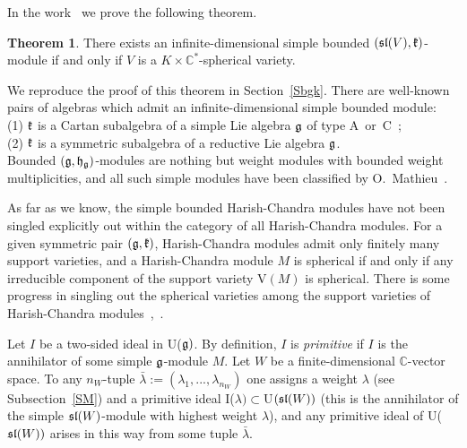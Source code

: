 \documentclass[12pt]{amsart}
\theoremstyle{definition}\newtheorem{theorem}{Theorem}[section]
\theoremstyle{definition}\newtheorem{definition}[proposition]{Definition}
\theoremstyle{remark}\newtheorem{example}[proposition]{Example}
\begin{document}
In the work~\cite{Ya1} we prove the following theorem.
\begin{theorem}\label{Tbgk}There exists an infinite-dimensional simple bounded $(\frak{sl}(V), \frak k)$-module if and only if $V$ is a $K \times\mathbb C^*$-spherical variety.\end{theorem}
We reproduce the proof of this theorem in Section~\ref{Sbgk}. There are well-known pairs of algebras which admit an infinite-dimensional simple bounded module:\\
(1) $\frak k$ is a Cartan subalgebra of a simple Lie algebra $\frak g$ of type A~or~C~\cite{F};\\
(2) $\frak k$ is a symmetric subalgebra of a reductive Lie algebra $\frak g$.\\
Bounded $(\frak g, \frak h_\frak g)$-modules are nothing but weight modules with bounded weight multiplicities, and all such simple modules have been classified by O.~Mathieu~\cite{M}.

As far as we know, the simple bounded Harish-Chandra modules have not been singled explicitly out within the category of all Harish-Chandra modules.
For a given symmetric pair $(\frak g, \frak k)$, Harish-Chandra modules admit only finitely many support varieties, and a Harish-Chandra module $M$ is spherical if and only if any irreducible component of the support variety V$(M)$ is spherical. There is some progress in singling out the spherical varieties among the support varieties of Harish-Chandra modules~\cite{Pan2},~\cite{Ki}.

Let $I$ be a two-sided ideal in U($\frak g)$. By definition, $I$ is {\it primitive} if $I$ is the annihilator of some simple $\frak g$-module $M$. Let $W$ be a finite-dimensional $\mathbb C$-vector space. To any $n_W$-tuple $\bar\lambda:=(\lambda_1, ..., \lambda_{n_W})$ one assigns a weight $\lambda$ (see Subsection~\ref{SM}) and a primitive ideal I($\lambda)\subset$U$(\frak{sl}(W))$ (this is the annihilator of the simple $\frak{sl}(W)$-module with highest weight $\lambda$), and any primitive ideal of U($\frak{sl}(W))$ arises in this way from some tuple $\bar\lambda$.
\end{document}
